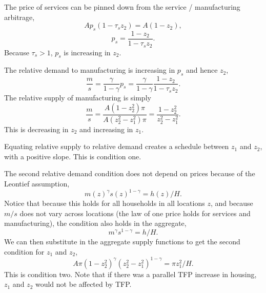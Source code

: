 \documentclass{amsart}
\theoremstyle{definition}
\theoremstyle{remark}
\numberwithin{equation}{section}
\begin{document}
The price of services can be pinned down from the service / manufacturing arbitrage,
\[
Ap_s(1-\tau_s z_2) = A(1-z_2),
\]
\[
p_s = \frac{1-z_2}{1-\tau_s z_2}.
\]
Because $\tau_s>1$, $p_s$ is increasing in $z_2$.

The relative demand to manufacturing is increasing in $p_s$ and hence $z_2$,
\[
\frac{m}{s} = \frac{\gamma}{1-\gamma}p_s = \frac{\gamma}{1-\gamma}\frac{1-z_2}{1-\tau_s z_2}.
\]
The relative supply of manufacturing is simply
\[
\frac{m}{s} = \frac{A(1-z_2^2)\pi}{A(z_2^2-z_1^2)\pi} = \frac{1-z_2^2}{z_2^2-z_1^2}.
\]
This is decreasing in $z_2$ and increasing in $z_1$.

Equating relative supply to relative demand creates a schedule between $z_1$ and $z_2$, with a positive slope. This is condition one.

The second relative demand condition does not depend on prices because of the Leontief assumption,
\[
m(z)^\gamma s(z)^{1-\gamma} = h(z)/H.
\]
Notice that because this holds for all households in all locations $z$, and because $m/s$ does not vary across locations (the law of one price holds for services and manufacturing), the condition also holds in the aggregate,
\[
m^\gamma s^{1-\gamma} = h/H.
\]
We can then substitute in the aggregate supply functions to get the second condition for $z_1$ and $z_2$,
\[
A\pi (1-z_2^2)^\gamma(z_2^2-z_1^2)^{1-\gamma} = \pi z_1^2/H.
\]
This is condition two. Note that if there was a parallel TFP increase in housing, $z_1$ and $z_2$ would not be affected by TFP.
\end{document}
